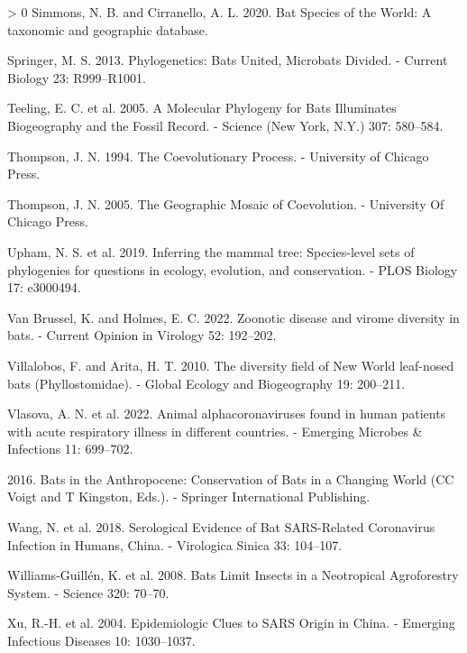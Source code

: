 \documentclass[11pt]{article}
\newlength{\cslhangindent}
\newenvironment{CSLReferences}[3] %
 {%
  \setlength{\parindent}{0pt}
  \ifodd #1 \everypar{\setlength{\hangindent}{\cslhangindent}}\ignorespaces\fi
  \ifnum #2 > 0
  \setlength{\parskip}{#2\baselineskip}
  \fi
 }%
 {}
\begin{document}
\begin{CSLReferences}{1}{0}
\leavevmode\hypertarget{ref-Simmons2020BatSpe}{}%
Simmons, N. B. and Cirranello, A. L. 2020. Bat Species of the World: A
taxonomic and geographic database.

\leavevmode\hypertarget{ref-Springer2013PhyBat}{}%
Springer, M. S. 2013. Phylogenetics: Bats United, Microbats Divided. -
Current Biology 23: R999--R1001.

\leavevmode\hypertarget{ref-Teeling2005MolPhy}{}%
Teeling, E. C. et al. 2005. A Molecular Phylogeny for Bats Illuminates
Biogeography and the Fossil Record. - Science (New York, N.Y.) 307:
580--584.

\leavevmode\hypertarget{ref-Thompson1994CoePro}{}%
Thompson, J. N. 1994. The Coevolutionary Process. - University of
Chicago Press.

\leavevmode\hypertarget{ref-Thompson2005GeoMos}{}%
Thompson, J. N. 2005. The Geographic Mosaic of Coevolution. - University
Of Chicago Press.

\leavevmode\hypertarget{ref-Upham2019InfMam}{}%
Upham, N. S. et al. 2019. Inferring the mammal tree: Species-level sets
of phylogenies for questions in ecology, evolution, and conservation. -
PLOS Biology 17: e3000494.

\leavevmode\hypertarget{ref-VanBrussel2022ZooDis}{}%
Van Brussel, K. and Holmes, E. C. 2022. Zoonotic disease and virome
diversity in bats. - Current Opinion in Virology 52: 192--202.

\leavevmode\hypertarget{ref-Villalobos2010DivFie}{}%
Villalobos, F. and Arita, H. T. 2010. The diversity field of New World
leaf-nosed bats (Phyllostomidae). - Global Ecology and Biogeography 19:
200--211.

\leavevmode\hypertarget{ref-Vlasova2022AniAlp}{}%
Vlasova, A. N. et al. 2022. Animal alphacoronaviruses found in human
patients with acute respiratory illness in different countries. -
Emerging Microbes \& Infections 11: 699--702.

\leavevmode\hypertarget{ref-Voigt2016BatAnt}{}%
2016. Bats in the Anthropocene: Conservation of Bats in a Changing World
(CC Voigt and T Kingston, Eds.). - Springer International Publishing.

\leavevmode\hypertarget{ref-Wang2018SerEvi}{}%
Wang, N. et al. 2018. Serological Evidence of Bat SARS-Related
Coronavirus Infection in Humans, China. - Virologica Sinica 33:
104--107.

\leavevmode\hypertarget{ref-Williams-Guillen2008BatLim}{}%
Williams-Guillén, K. et al. 2008. Bats Limit Insects in a Neotropical
Agroforestry System. - Science 320: 70--70.

\leavevmode\hypertarget{ref-Xu2004EpiClu}{}%
Xu, R.-H. et al. 2004. Epidemiologic Clues to SARS Origin in China. -
Emerging Infectious Diseases 10: 1030--1037.

\end{CSLReferences}
\end{document}
